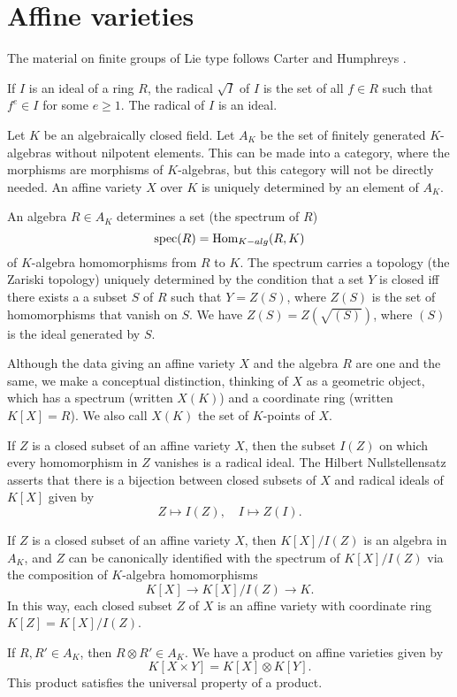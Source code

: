 \section{Affine varieties}


The material on finite groups of Lie type follows Carter
\cite{carter1985finite} and Humphreys \cite{humphreys2012linear}.

If $I$ is an ideal of a ring $R$, the radical $\sqrt{I}$ of $I$ is the
set of all $f \in R$ such that $f^e \in I$ for some $e\ge 1$.  The
radical of $I$ is an ideal.

Let $K$ be an algebraically closed field.  Let $A_K$ be the set of
finitely generated $K$-algebras without nilpotent elements.  This can
be made into a category, where the morphisms are morphisms of
$K$-algebras, but this category will not be directly needed.  An
affine variety $X$ over $K$ is uniquely determined by an element of
$A_K$.

An algebra $R\in A_K$ determines a set (the spectrum of $R$)
\[
\text{spec}(R) = \text{Hom}_{K-alg}(R,K)
\]
of $K$-algebra homomorphisms from $R$ to $K$.  The spectrum carries a
topology (the Zariski topology) uniquely determined by the condition
that a set $Y$ is closed iff there exists a a subset $S$ of $R$ such
that $Y=Z(S)$, where $Z(S)$ is the set of homomorphisms that vanish on
$S$.  We have $Z(S) = Z(\sqrt{(S)})$, where $(S)$ is the ideal
generated by $S$.

Although the data giving an affine variety $X$ and the algebra $R$ are
one and the same, we make a conceptual distinction, thinking of $X$ as
a geometric object, which has a spectrum (written $X(K)$) and a
coordinate ring (written $K[X]=R$).  We also call $X(K)$ the set of
$K$-points of $X$.

If $Z$ is a closed subset of an affine variety $X$, then the subset
$I(Z)$ on which every homomorphism in $Z$ vanishes is a radical ideal.
The Hilbert Nullstellensatz asserts that there is a bijection between
closed subsets of $X$ and radical ideals of $K[X]$ given by
\[
Z \mapsto I(Z),\quad I\mapsto Z(I).
\]

If $Z$ is a closed subset of an affine variety $X$, then $K[X]/I(Z)$
is an algebra in $A_K$, and $Z$ can be canonically identified with the
spectrum of $K[X]/I(Z)$ via the composition of $K$-algebra
homomorphisms
\[
K[X] \to K[X]/I(Z) \to K.
\]
In this way, each closed subset $Z$ of $X$ is an affine variety with
coordinate ring $K[Z] = K[X]/I(Z)$.

If $R,R'\in A_K$, then $R\otimes R'\in A_K$.  We have a product on
affine varieties given by
\[
K[X \times Y] = K[X]\otimes K[Y].
\]
This product satisfies the universal property of a product.

